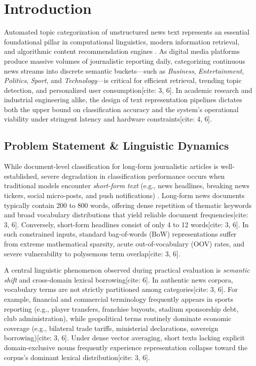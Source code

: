 \documentclass[11pt,a4paper]{article}
\begin{document}
	\newpage
	
	\section{Introduction}
	\label{sec:introduction}
	
	Automated topic categorization of unstructured news text represents an essential foundational pillar in computational linguistics, modern information retrieval, and algorithmic content recommendation engines \cite{manning2008introduction}. As digital media platforms produce massive volumes of journalistic reporting daily, categorizing continuous news streams into discrete semantic buckets---such as \textit{Business}, \textit{Entertainment}, \textit{Politics}, \textit{Sport}, and \textit{Technology}---is critical for efficient retrieval, trending topic detection, and personalized user consumption[cite: 3, 6]. In academic research and industrial engineering alike, the design of text representation pipelines dictates both the upper bound on classification accuracy and the system's operational viability under stringent latency and hardware constraints[cite: 4, 6].
	
	\subsection{Problem Statement \& Linguistic Dynamics}
	While document-level classification for long-form journalistic articles is well-established, severe degradation in classification performance occurs when traditional models encounter \textit{short-form text} (e.g., news headlines, breaking news tickers, social micro-posts, and push notifications) \cite{wang2012baselines}. Long-form news documents typically contain 200 to 800 words, offering dense repetition of thematic keywords and broad vocabulary distributions that yield reliable document frequencies[cite: 3, 6]. Conversely, short-form headlines consist of only 4 to 12 words[cite: 3, 6]. In such constrained inputs, standard bag-of-words (BoW) representations suffer from extreme mathematical sparsity, acute out-of-vocabulary (OOV) rates, and severe vulnerability to polysemous term overlap[cite: 3, 6].
	
	A central linguistic phenomenon observed during practical evaluation is \textit{semantic shift} and cross-domain lexical borrowing[cite: 6]. In authentic news corpora, vocabulary terms are not strictly partitioned among categories[cite: 3, 6]. For example, financial and commercial terminology frequently appears in sports reporting (e.g., player transfers, franchise buyouts, stadium sponsorship debt, club administration), while geopolitical terms routinely dominate economic coverage (e.g., bilateral trade tariffs, ministerial declarations, sovereign borrowing)[cite: 3, 6]. Under dense vector averaging, short texts lacking explicit domain-exclusive nouns frequently experience representation collapse toward the corpus's dominant lexical distribution[cite: 3, 6].
	
\end{document}
